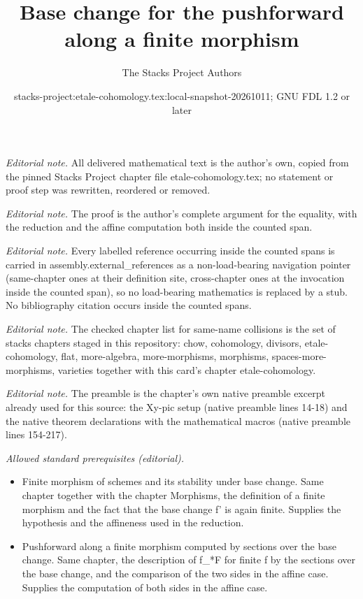 \documentclass[10pt,a4paper]{amsart}
\title{Base change for the pushforward along a finite morphism}
\author{The Stacks Project Authors}
\date{stacks-project:etale-cohomology.tex:local-snapshot-20261011; GNU FDL 1.2 or later}
\theoremstyle{plain}
\theoremstyle{definition}
\theoremstyle{remark}
\numberwithin{equation}{subsection}
\begin{document}
\maketitle
\noindent\textit{Editorial note.} All delivered mathematical text is the author's own, copied from the pinned Stacks Project chapter file etale-cohomology.tex; no statement or proof step was rewritten, reordered or removed.\par\medskip
\noindent\textit{Editorial note.} The proof is the author's complete argument for the equality, with the reduction and the affine computation both inside the counted span.\par\medskip
\noindent\textit{Editorial note.} Every labelled reference occurring inside the counted spans is carried in assembly.external\_references as a non-load-bearing navigation pointer (same-chapter ones at their definition site, cross-chapter ones at the invocation inside the counted span), so no load-bearing mathematics is replaced by a stub. No bibliography citation occurs inside the counted spans.\par\medskip
\noindent\textit{Editorial note.} The checked chapter list for same-name collisions is the set of stacks chapters staged in this repository: chow, cohomology, divisors, etale-cohomology, flat, more-algebra, more-morphisms, morphisms, spaces-more-morphisms, varieties together with this card's chapter etale-cohomology.\par\medskip
\noindent\textit{Editorial note.} The preamble is the chapter's own native preamble excerpt already used for this source: the Xy-pic setup (native preamble lines 14-18) and the native theorem declarations with the mathematical macros (native preamble lines 154-217).\par\medskip
\noindent\textit{Allowed standard prerequisites (editorial).}\begin{itemize}
\item Finite morphism of schemes and its stability under base change. Same chapter together with the chapter Morphisms, the definition of a finite morphism and the fact that the base change f' is again finite. Supplies the hypothesis and the affineness used in the reduction.
\item Pushforward along a finite morphism computed by sections over the base change. Same chapter, the description of f\_*F for finite f by the sections over the base change, and the comparison of the two sides in the affine case. Supplies the computation of both sides in the affine case.
\end{itemize}\medskip
\end{document}
